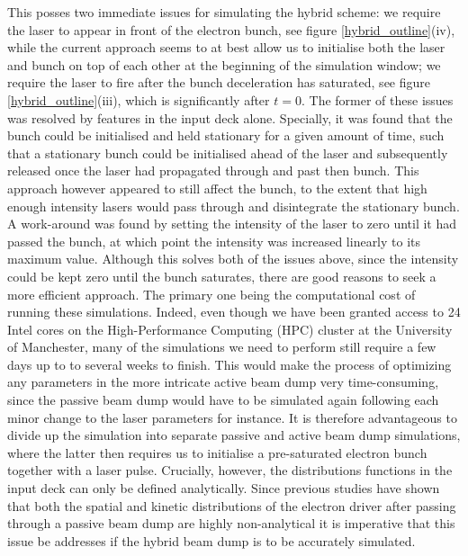 \indent This posses two immediate issues for simulating the hybrid scheme: we require the laser to appear in front of the electron bunch, see figure \ref{hybrid_outline}(iv), while the current approach seems to at best allow us to initialise both the laser and bunch on top of each other at the beginning of the simulation window; we require the laser to fire after the bunch deceleration has saturated, see figure \ref{hybrid_outline}(iii), which is significantly after $t=0$. The former of these issues was resolved by features in the input deck alone. Specially, it was found that the bunch could be initialised and held stationary for a given amount of time, such that a stationary bunch could be initialised ahead of the laser and subsequently released once the laser had propagated through and past then bunch. This approach however appeared to still affect the bunch, to the extent that high enough intensity lasers would pass through and disintegrate the stationary bunch. A work-around was found by setting the intensity of the laser to zero until it had passed the bunch, at which point the intensity was increased linearly to its maximum value. Although this solves both of the issues above, since the intensity could be kept zero until the bunch saturates, there are good reasons to seek a more efficient approach. The primary one being the computational cost of running these simulations. Indeed, even though we have been granted access to 24 Intel cores on the High-Performance Computing (HPC) cluster at the University of Manchester, many of the simulations we need to perform still require a few days up to to several weeks to finish. This would make the process of optimizing any parameters in the more intricate active beam dump very time-consuming, since the passive beam dump would have to be simulated again following each minor change to the laser parameters for instance. It is therefore advantageous to divide up the simulation into separate passive and active beam dump simulations, where the latter then requires us to initialise a pre-saturated electron bunch together with a laser pulse.
Crucially, however, the distributions functions in the input deck can only be defined analytically. Since previous studies \cite{Wu2010, Bonatto2015, Hanahoe2017} have shown that both the spatial and kinetic distributions of the electron driver after passing through a passive beam dump are highly non-analytical it is imperative that this issue be addresses if the hybrid beam dump is to be accurately simulated. 


